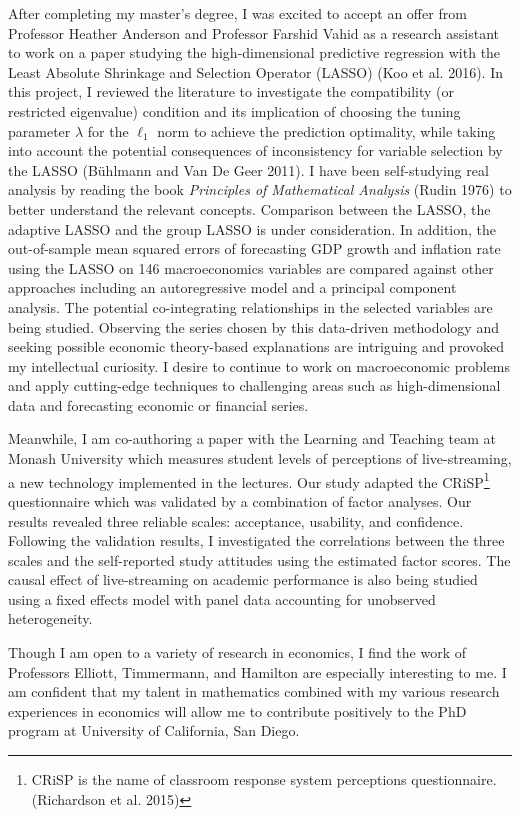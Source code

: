 \documentclass[12pt,]{article}
\let\rmarkdownfootnote\footnote%
\def\footnote{\protect\rmarkdownfootnote}
\begin{document}
After completing my master's degree, I was excited to accept an offer
from Professor Heather Anderson and Professor Farshid Vahid as a
research assistant to work on a paper studying the high-dimensional
predictive regression with the Least Absolute Shrinkage and Selection
Operator (LASSO) (Koo et al. 2016). In this project, I reviewed the
literature to investigate the compatibility (or restricted eigenvalue)
condition and its implication of choosing the tuning parameter
\(\lambda\) for the \(\ell_1\) norm to achieve the prediction
optimality, while taking into account the potential consequences of
inconsistency for variable selection by the LASSO (Bühlmann and Van De
Geer 2011). I have been self-studying real analysis by reading the book
\emph{Principles of Mathematical Analysis} (Rudin 1976) to better
understand the relevant concepts. Comparison between the LASSO, the
adaptive LASSO and the group LASSO is under consideration. In addition,
the out-of-sample mean squared errors of forecasting GDP growth and
inflation rate using the LASSO on 146 macroeconomics variables are
compared against other approaches including an autoregressive model and
a principal component analysis. The potential co-integrating
relationships in the selected variables are being studied. Observing the
series chosen by this data-driven methodology and seeking possible
economic theory-based explanations are intriguing and provoked my
intellectual curiosity. I desire to continue to work on macroeconomic
problems and apply cutting-edge techniques to challenging areas such as
high-dimensional data and forecasting economic or financial series.

Meanwhile, I am co-authoring a paper with the Learning and Teaching team
at Monash University which measures student levels of perceptions of
live-streaming, a new technology implemented in the lectures. Our study
adapted the CRiSP\footnote{CRiSP is the name of classroom response
  system perceptions questionnaire. (Richardson et al. 2015)}
questionnaire which was validated by a combination of factor analyses.
Our results revealed three reliable scales: acceptance, usability, and
confidence. Following the validation results, I investigated the
correlations between the three scales and the self-reported study
attitudes using the estimated factor scores. The causal effect of
live-streaming on academic performance is also being studied using a
fixed effects model with panel data accounting for unobserved
heterogeneity.

Though I am open to a variety of research in economics, I find the work
of Professors Elliott, Timmermann, and Hamilton are especially
interesting to me. I am confident that my talent in mathematics combined
with my various research experiences in economics will allow me to
contribute positively to the PhD program at University of California,
San Diego.
\end{document}
